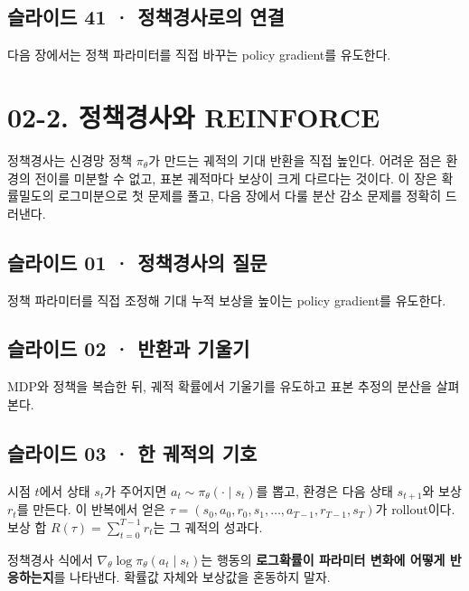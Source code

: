 \documentclass[11pt,a4paper]{article}
\begin{document}
\subsection{슬라이드 41 · 정책경사로의 연결}

다음 장에서는 정책 파라미터를 직접 바꾸는 policy gradient를 유도한다.\par

\clearpage
\section{02-2. 정책경사와 REINFORCE}


정책경사는 신경망 정책 $\pi_\theta$가 만드는 궤적의 기대 반환을 직접 높인다. 어려운 점은 환경의 전이를 미분할 수 없고, 표본 궤적마다 보상이 크게 다르다는 것이다. 이 장은 확률밀도의 로그미분으로 첫 문제를 풀고, 다음 장에서 다룰 분산 감소 문제를 정확히 드러낸다.\par

\subsection{슬라이드 01 · 정책경사의 질문}

정책 파라미터를 직접 조정해 기대 누적 보상을 높이는 policy gradient를 유도한다.\par

\subsection{슬라이드 02 · 반환과 기울기}

MDP와 정책을 복습한 뒤, 궤적 확률에서 기울기를 유도하고 표본 추정의 분산을 살펴본다.\par

\subsection{슬라이드 03 · 한 궤적의 기호}

시점 $t$에서 상태 $s_t$가 주어지면 $a_t\sim\pi_\theta(\cdot\mid s_t)$를 뽑고, 환경은 다음 상태 $s_{t+1}$와 보상 $r_t$를 만든다. 이 반복에서 얻은 $\tau=(s_0,a_0,r_0,s_1,\ldots,a_{T-1},r_{T-1},s_T)$가 rollout이다. 보상 합 $R(\tau)=\sum_{t=0}^{T-1}r_t$는 그 궤적의 성과다.\par

정책경사 식에서 $\nabla_\theta\log\pi_\theta(a_t\mid s_t)$는 행동의 \textbf{로그확률이 파라미터 변화에 어떻게 반응하는지}를 나타낸다. 확률값 자체와 보상값을 혼동하지 말자.\par
\end{document}
